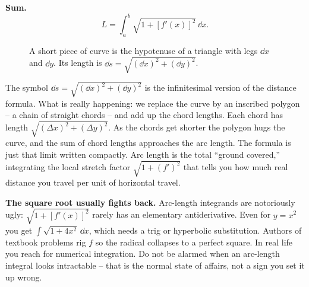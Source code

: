 \textbf{Sum.}
\[
  \boxed{\,L = \int_a^b \sqrt{1 + [f'(x)]^2}\,\dd x.\,}
\]

\begin{figure}[H]
\centering
{}
\caption{A short piece of curve is the hypotenuse of a triangle with legs $\dd x$
and $\dd y$. Its length is $\dd s = \sqrt{(\dd x)^2+(\dd y)^2}$.}
\label{ch26:fig-arclength}
\end{figure}

\begin{happeningbox}
The symbol $\dd s = \sqrt{(\dd x)^2 + (\dd y)^2}$ is the infinitesimal version of
the distance formula. What is really happening: we replace the curve by an
inscribed polygon -- a chain of straight chords -- and add up the chord lengths.
Each chord has length $\sqrt{(\Delta x)^2 + (\Delta y)^2}$. As the chords get
shorter the polygon hugs the curve, and the sum of chord lengths approaches the
arc length. The formula is just that limit written compactly. Arc length is the
total ``ground covered,'' integrating the local stretch factor
$\sqrt{1+(f')^2}$ that tells you how much real distance you travel per unit of
horizontal travel.
\end{happeningbox}

\begin{trapbox}
\textbf{The square root usually fights back.} Arc-length integrands are
notoriously ugly: $\sqrt{1+[f'(x)]^2}$ rarely has an elementary antiderivative.
Even for $y=x^2$ you get $\int\sqrt{1+4x^2}\,\dd x$, which needs a trig or
hyperbolic substitution. Authors of textbook problems rig $f$ so the radical
collapses to a perfect square. In real life you reach for numerical integration.
Do not be alarmed when an arc-length integral looks intractable -- that is the
normal state of affairs, not a sign you set it up wrong.
\end{trapbox}

